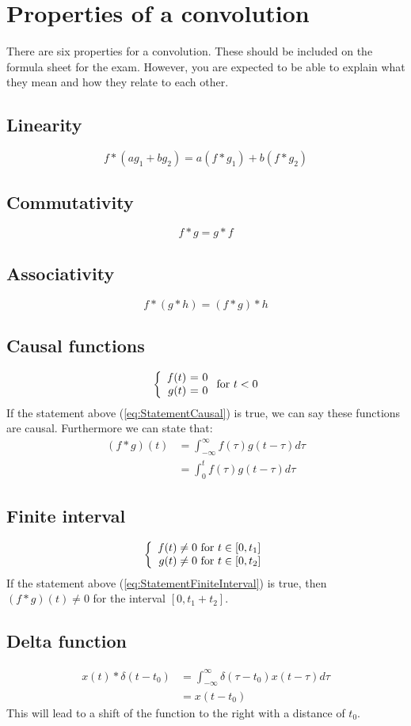 \documentclass[]{subfiles}
\begin{document}
	\section{Properties of a convolution}
	 There are six properties for a convolution. These should be included on the formula sheet for the exam. However, you are expected to be able to explain what they mean and how they relate to each other.
	 \subsection{Linearity}
	 \begin{equation}
	 	f\ast (ag_1+bg_2)= a(f\ast g_1)  +b(f\ast g_2)
	 \end{equation}
 	\subsection{Commutativity}
 	\begin{equation}
 		f\ast g = g \ast f
 	\end{equation}
 \subsection{Associativity}
 \begin{equation}
 	f\ast (g\ast h) = (f\ast g) \ast h
 \end{equation}
\subsection{Causal functions}
\label{sec:causalFunctions}
\begin{equation}
	\left\{ \begin{array}{r@{\text{ = }}l}
		f(t)& 0\\
		g(t)&0
	\end{array}\right.
	\text{for } t<0
	\label{eq:StatementCausal}
\end{equation}
If the statement above (\ref{eq:StatementCausal}) is true, we can say these functions are causal. Furthermore we can state that:
\begin{align*}
	(f\ast g) (t) &= \int_{-\infty}^{\infty} f(\tau)g(t-\tau)d\tau\\
	&= \int_{0}^{t}f(\tau)g(t-\tau)d\tau
\end{align*}
\subsection{Finite interval}
\begin{equation}
	\left\{ \begin{array}{r@{\text{ for }}l}
		f(t)\neq 0& t\in\left[ 0,t_1\right] \\
		g(t)\neq 0&t\in \left[ 0,t_2\right] 
	\end{array}\right.
	\label{eq:StatementFiniteInterval}
\end{equation}
If the statement above (\ref{eq:StatementFiniteInterval}) is true, then $(f\ast g)(t)\neq 0$ for the interval $\left[0,t_1+t_2 \right] $.
\subsection{Delta function}
\begin{align*}
	x(t)\ast \delta(t-t_0) &= \int_{-\infty}^{\infty}\delta(\tau-t_0)x(t-\tau)d\tau\\
	&=  x(t-t_0)
\end{align*}
This will lead to a shift of the function to the right with a distance of $t_0$. 
\end{document}
